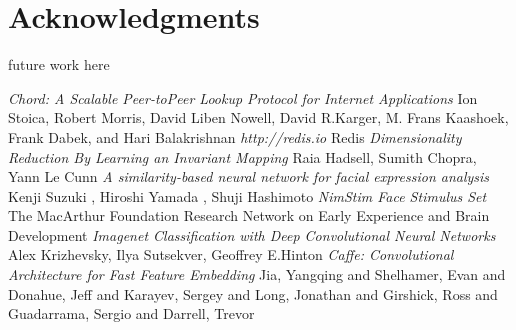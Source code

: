 \documentclass[10pt,twocolumn,letterpaper]{article}
\begin{document}
\section{Acknowledgments} \label{acknowledgments}
future work here
\begin{thebibliography}{9}
 \emph{Chord: A Scalable Peer-toPeer Lookup Protocol for Internet Applications}  Ion Stoica, Robert Morris, David Liben Nowell, David R.Karger, M. Frans Kaashoek, Frank Dabek, and Hari Balakrishnan
 \emph{http://redis.io}  Redis
 \emph{Dimensionality Reduction By Learning an Invariant Mapping} Raia Hadsell, Sumith Chopra, Yann Le Cunn
 \emph{A similarity-based neural network for facial expression analysis} Kenji Suzuki , Hiroshi Yamada , Shuji Hashimoto
 \emph{NimStim Face Stimulus Set} The MacArthur Foundation Research Network on Early Experience and Brain Development
 \emph{Imagenet Classification with Deep Convolutional Neural Networks} Alex Krizhevsky, Ilya Sutsekver, Geoffrey E.Hinton
 \emph{Caffe: Convolutional Architecture for Fast Feature Embedding} Jia, Yangqing and Shelhamer, Evan and Donahue, Jeff and Karayev, Sergey and Long, Jonathan and Girshick, Ross and Guadarrama, Sergio and Darrell, Trevor
\end{thebibliography}
{\small


} 
\end{document}
